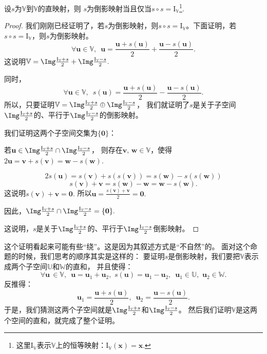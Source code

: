 \documentclass[12pt,UTF8,fontset=none]{ctexbook}
\begin{document}
\begin{pp}\label{pp:3_5}
    设$s$为$\mathbb{V}$到$\mathbb{V}$的直映射，则
    $s$为倒影映射当且仅当$s\circ s = \mathrm{I}_{\mathbb{V}}$\footnote{这里$\mathrm{I}_{\mathbb{V}}$表示$\mathbb{V}$上的恒等映射：$\mathrm{I}_{\mathbb{V}}(\mathbf{x}) = \mathbf{x}.$}.
\end{pp}
\begin{proof} %
    我们刚刚已经证明了，若$s$为倒影映射，则$s\circ s = \mathrm{I}_{\mathbb{V}}$。下面证明，若$s\circ s = \mathrm{I}_{\mathbb{V}}$，则$s$为倒影映射。
    $$\forall \mathbf{u}\in\mathbb{V}, \,\,\, \mathbf{u} = \frac{\mathbf{u} + s(\mathbf{u})}{2} + \frac{\mathbf{u} - s(\mathbf{u})}{2}.$$
    这说明$\mathbb{V}=\Img \frac{\mathrm{I}_{\mathbb{V}} + s}{2} + \Img \frac{\mathrm{I}_{\mathbb{V}} - s}{2}.$

    同时，
    $$\forall \mathbf{u}\in\mathbb{V}, \,\,\, s(\mathbf{u}) = \frac{\mathbf{u} + s(\mathbf{u})}{2} - \frac{\mathbf{u} - s(\mathbf{u})}{2}.$$
    所以，只要证明$\mathbb{V}=\Img \frac{\mathrm{I}_{\mathbb{V}} + s}{2} \oplus \Img \frac{\mathrm{I}_{\mathbb{V}} - s}{2}$，
    我们就证明了$s$是关于子空间$\Img \frac{\mathrm{I}_{\mathbb{V}} + s}{2}$的、平行于$\Img \frac{\mathrm{I}_{\mathbb{V}} - s}{2}$的倒影映射。

    我们证明这两个子空间交集为$\{\mathbf{0}\}$：

    若$\mathbf{u} \in \Img \frac{\mathrm{I}_{\mathbb{V}} + s}{2} \cap \Img \frac{\mathrm{I}_{\mathbb{V}} - s}{2}$，
    则存在$\mathbf{v},\,\mathbf{w} \in \mathbb{V}$，使得$2\mathbf{u} = \mathbf{v} + s(\mathbf{v}) = \mathbf{w} - s(\mathbf{w}).$

    $$ 2s(\mathbf{u}) = s(\mathbf{v}) + s(s(\mathbf{v})) = s(\mathbf{w}) - s(s(\mathbf{w}))$$
    $$ s(\mathbf{v}) + \mathbf{v} = s(\mathbf{w}) - \mathbf{w} = \mathbf{w} - s(\mathbf{w}).$$
    这说明$s(\mathbf{v}) + \mathbf{v} = \mathbf{0}.$ 所以$\mathbf{u} = \frac{s(\mathbf{v}) + \mathbf{v}}{2} = \mathbf{0}.$

    因此，$\Img \frac{\mathrm{I}_{\mathbb{V}} + s}{2} \cap \Img \frac{\mathrm{I}_{\mathbb{V}} - s}{2} = \{\mathbf{0}\}.$

    这说明，$s$是关于$\Img \frac{\mathrm{I}_{\mathbb{V}} + s}{2}$的、平行于$\Img \frac{\mathrm{I}_{\mathbb{V}} - s}{2}$倒影映射。

\end{proof}


这个证明看起来可能有些“绕”。这是因为其叙述方式是“不自然”的。
面对这个命题的时候，我们思考的顺序其实是这样的：
要证明$s$是倒影映射，我们要把$\mathbb{V}$表示成两个子空间$\mathbb{U}$和$\mathbb{W}$的直和，
并且使得：
$$ \forall \mathbf{u} \,\in \mathbb{V},\,\,\, \mathbf{u} = \mathbf{u}_1 + \mathbf{u}_2, \,\, s(\mathbf{u}) = \mathbf{u}_1 - \mathbf{u}_2,\,\,\, \mathbf{u}_1 \in\mathbb{U},\,\,\mathbf{u}_2 \in\mathbb{W}.$$
反推得：
$$ \mathbf{u}_1 = \frac{\mathbf{u} + s(\mathbf{u})}{2},\,\,\, \mathbf{u}_2 = \frac{\mathbf{u} - s(\mathbf{u})}{2}.$$ 
于是，我们猜测这两个子空间就是$\Img \frac{\mathrm{I}_{\mathbb{V}} + s}{2}$和$\Img \frac{\mathrm{I}_{\mathbb{V}} - s}{2}$。
然后我们证明$\mathbb{V}$是这两个空间的直和，就完成了整个证明。
\end{document}
